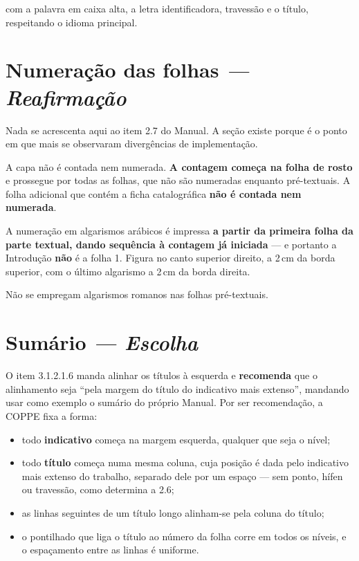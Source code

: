 \documentclass[a4paper,11pt]{article}
\newcommand\tipo[1]{\normalfont\textit{--- #1}}
\begin{document}
com a palavra em caixa alta, a letra identificadora, travessão e o título,
respeitando o idioma principal.

\section{Numeração das folhas \tipo{Reafirmação}}

Nada se acrescenta aqui ao item 2.7 do Manual. A seção existe porque é o ponto
em que mais se observaram divergências de implementação.

A capa não é contada nem numerada. \textbf{A contagem começa na folha de rosto}
e prossegue por todas as folhas, que não são numeradas enquanto pré-textuais. A
folha adicional que contém a ficha catalográfica \textbf{não é contada nem
numerada}.

A numeração em algarismos arábicos é impressa \textbf{a partir da primeira folha
da parte textual, dando sequência à contagem já iniciada} --- e portanto a
Introdução \textbf{não} é a folha 1. Figura no canto superior direito, a 2\,cm
da borda superior, com o último algarismo a 2\,cm da borda direita.

Não se empregam algarismos romanos nas folhas pré-textuais.

\section{Sumário \tipo{Escolha}}

O item 3.1.2.1.6 manda alinhar os títulos à esquerda e \textbf{recomenda} que o
alinhamento seja ``pela margem do título do indicativo mais extenso'', mandando
usar como exemplo o sumário do próprio Manual. Por ser recomendação, a COPPE
fixa a forma:

\begin{itemize}[nosep]
  \item todo \textbf{indicativo} começa na margem esquerda, qualquer que seja o
    nível;
  \item todo \textbf{título} começa numa mesma coluna, cuja posição é dada pelo
    indicativo mais extenso do trabalho, separado dele por um espaço --- sem
    ponto, hífen ou travessão, como determina a 2.6;
  \item as linhas seguintes de um título longo alinham-se pela coluna do
    título;
  \item o pontilhado que liga o título ao número da folha corre em todos os
    níveis, e o espaçamento entre as linhas é uniforme.
\end{itemize}
\end{document}
